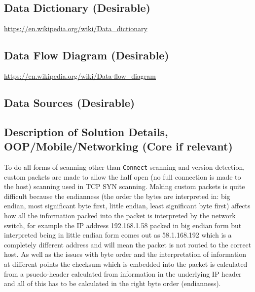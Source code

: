 \documentclass[titlepage]{article}
\begin{document}
\subsection{Data Dictionary (Desirable)}

\textbf{\color{red}{I looked this up and it seemed to be related to database management systems.}}

\href{https://en.wikipedia.org/wiki/Data_dictionary}{https://en.wikipedia.org/wiki/Data\_dictionary}

\subsection{Data Flow Diagram (Desirable)}

\textbf{\color{red}{This seems to be fairly relevant and to do with how data goes through my program
    i.e.\ going from the network to my port scanner into a target object and other scanners
before version detection and finally displaying to the user. Make a flowchart for this.}}

\href{https://en.wikipedia.org/wiki/Data-flow_diagram<Paste>}{https://en.wikipedia.org/wiki/Data-flow\_diagram}

\subsection{Data Sources (Desirable)}

\textbf{\color{red}{Not really sure about this.}}

\subsection{Description of Solution Details, OOP/Mobile/Networking (Core if relevant)}

To do all forms of scanning other than \verb|Connect| scanning and version detection, custom
packets are made to allow the half open (no full connection is made to the host) scanning
used in TCP SYN scanning. Making custom packets is quite difficult because the endianness
(the order the bytes are interpreted in: big endian, most significant byte first, little endian,
least significant byte first) affects how all the information packed into the packet is interpreted
by the network switch, for example the IP address 192.168.1.58 packed in big endian form but interpreted
being in little endian form comes out as 58.1.168.192 which is a completely different address and
will mean the packet is not routed to the correct host. As well as the issues with byte order
and the interpretation of information at different points the checksum which is embedded into
the packet is calculated from a psuedo-header calculated from information in the underlying
IP header and all of this has to be calculated in the right byte order (endianness).
\end{document}
